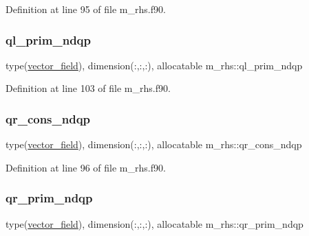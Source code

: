 Definition at line 95 of file m\+\_\+rhs.\+f90.

\mbox{\label{namespacem__rhs_aeb611ac510e15d25ae5313627f9a55af}} 
\subsubsection{\texorpdfstring{ql\+\_\+prim\+\_\+ndqp}{ql\_prim\_ndqp}}
{\footnotesize\ttfamily type(\hyperlink{structm__derived__types_1_1vector__field}{vector\+\_\+field}), dimension(\+:,\+:,\+:), allocatable m\+\_\+rhs\+::ql\+\_\+prim\+\_\+ndqp}



Definition at line 103 of file m\+\_\+rhs.\+f90.

\mbox{\label{namespacem__rhs_a1b6a05895f56a60c075e4eee3f1b4d51}} 
\subsubsection{\texorpdfstring{qr\+\_\+cons\+\_\+ndqp}{qr\_cons\_ndqp}}
{\footnotesize\ttfamily type(\hyperlink{structm__derived__types_1_1vector__field}{vector\+\_\+field}), dimension(\+:,\+:,\+:), allocatable m\+\_\+rhs\+::qr\+\_\+cons\+\_\+ndqp}



Definition at line 96 of file m\+\_\+rhs.\+f90.

\mbox{\label{namespacem__rhs_addb553c30e5a799670b33c66a27995d6}} 
\subsubsection{\texorpdfstring{qr\+\_\+prim\+\_\+ndqp}{qr\_prim\_ndqp}}
{\footnotesize\ttfamily type(\hyperlink{structm__derived__types_1_1vector__field}{vector\+\_\+field}), dimension(\+:,\+:,\+:), allocatable m\+\_\+rhs\+::qr\+\_\+prim\+\_\+ndqp}




